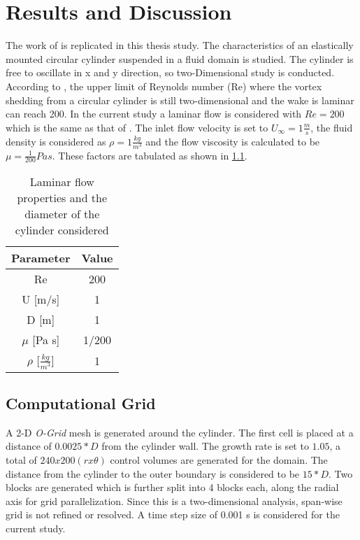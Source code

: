 %
% 


\chapter{Results and Discussion}
\label{sec:results}

The work of \citet{zhou1999vortex} is replicated in this thesis study. The characteristics of an elastically mounted circular cylinder suspended in a fluid domain is studied. The cylinder is free to oscillate in x and y direction, so two-Dimensional study is conducted. According to \citet{williamson1996vortex}, the upper limit of Reynolds number (Re) where the vortex shedding from a circular cylinder is still two-dimensional and the wake is laminar can reach 200. In the current study a laminar flow is considered with $Re=200$ which is the same as that of \citet{zhou1999vortex}. The inlet flow velocity is set to $U_\infty = 1 \frac{m}{s}$, the fluid density is considered as $\rho = 1 \frac{kg}{m^3}$ and the flow viscosity is calculated to be $\mu=\frac{1}{200} Pa s$. These factors are tabulated as shown in \ref{table:4.1}. 

\begin{table}[H]
 \centering
	\begin{tabular}{|c|c|}
		\hline 
		Parameter & Value\tabularnewline
		\hline 
		Re & 200\tabularnewline
		\hline 
		U {[}m/s{]} & 1\tabularnewline
		\hline 
		D {[}m{]} & 1\tabularnewline
		\hline 
		$\mu$ {[}Pa s{]} & 1/200\tabularnewline
		\hline 
		$\rho$ {[}$\frac{kg}{m^{3}}${]} & 	1\tabularnewline
		\hline 
	\end{tabular}
\caption{Laminar flow properties and the diameter of the cylinder considered}
\label{table:4.1}
\end{table}

\section{Computational Grid}

A 2-D \textit{O-Grid} mesh is generated around the cylinder. The first cell is placed at a distance of $0.0025*D$ from the cylinder wall. The growth rate is set to $1.05$, a total of $240x200 (r x \theta)$ control volumes are generated for the domain. The distance from the cylinder to the outer boundary is considered to be $15*D$. Two blocks are generated which is further split into 4 blocks each, along the radial axis for grid parallelization. Since this is a two-dimensional analysis, span-wise grid is not refined or resolved. A time step size of 0.001 s is considered for the current study. 

